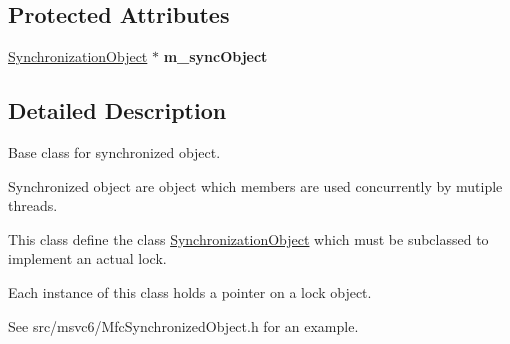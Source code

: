 \subsection*{Protected Attributes}
\begin{DoxyCompactItemize}
\item 
\hypertarget{class_synchronized_object_ae27755a0d24a6b2cbb516cff60a5cabc}{\hyperlink{class_synchronized_object_1_1_synchronization_object}{Synchronization\+Object} $\ast$ {\bfseries m\+\_\+sync\+Object}}\label{class_synchronized_object_ae27755a0d24a6b2cbb516cff60a5cabc}

\end{DoxyCompactItemize}


\subsection{Detailed Description}
Base class for synchronized object. 

Synchronized object are object which members are used concurrently by mutiple threads.

This class define the class \hyperlink{class_synchronized_object_1_1_synchronization_object}{Synchronization\+Object} which must be subclassed to implement an actual lock.

Each instance of this class holds a pointer on a lock object.

See src/msvc6/\+Mfc\+Synchronized\+Object.\+h for an example. 

